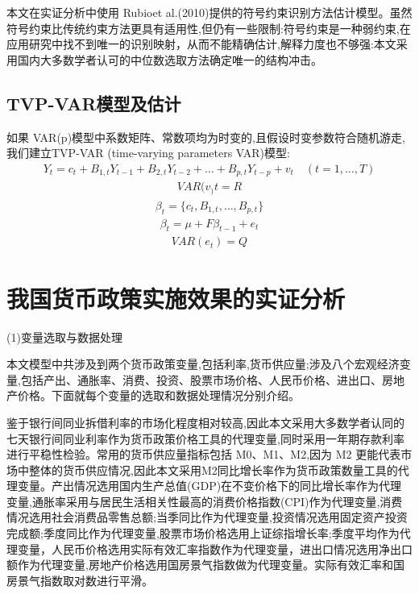 \documentclass{ijclclp}
\begin{document}
本文在实证分析中使用 Rubioet al.(2010)提供的符号约束识别方法估计模型。虽然符号约束比传统约束方法更具有适用性,但仍有一些限制:符号约束是一种弱约束,在应用研究中找不到唯一的识别映射，从而不能精确估计,解释力度也不够强:本文采用国内大多数学者认可的中位数选取方法确定唯一的结构冲击。

\subsection{TVP-VAR模型及估计}
如果 VAR(p)模型中系数矩阵、常数项均为时变的,且假设时变参数符合随机游走,我们建立TVP-VAR (time-varying parameters VAR)模型:
\begin{equation}
\begin{aligned}
Y_t = c_t + B_{1,t}Y_{t-1} + B_{2,t}Y_{t-2} + \dots + B_{p,t}Y_{t-p} + v_t \quad(t=1,\dots ,T)
\end{aligned}
\tag{9}
\end{equation}
\begin{equation}
\begin{aligned}
VAR(v_)t=R
\end{aligned}
\tag{10}
\end{equation}
\begin{equation}
\begin{aligned}
\beta_t=\{c_t,B_{1,t},\dots ,B_{p,t}\}
\end{aligned}
\tag{11}
\end{equation}
\begin{equation}
\begin{aligned}
\beta_t=\mu+F\beta_{t-1}+e_t
\end{aligned}
\tag{12}
\end{equation}
\begin{equation}
\begin{aligned}
VAR(e_t)=Q
\end{aligned}
\tag{12}
\end{equation}

\section{我国货币政策实施效果的实证分析}
(1)变量选取与数据处理

本文模型中共涉及到两个货币政策变量,包括利率,货币供应量;涉及八个宏观经济变量,包括产出、通胀率、消费、投资、股票市场价格、人民币价格、进出口、房地产价格。下面就每个变量的选取和数据处理情况分别介绍。

鉴于银行间同业拆借利率的市场化程度相对较高,因此本文采用大多数学者认同的七天银行间同业利率作为货币政策价格工具的代理变量,同时采用一年期存款利率进行平稳性检验。常用的货币供应量指标包括 M0、M1、M2,因为 M2 更能代表市场中整体的货币供应情况,因此本文采用M2同比增长率作为货币政策数量工具的代理变量。产出情况选用国内生产总值(GDP)在不变价格下的同比增长率作为代理变量,通胀率采用与居民生活相关性最高的消费价格指数(CPI)作为代理变量,消费情况选用社会消费品零售总额;当季同比作为代理变量,投资情况选用固定资产投资完成额;季度同比作为代理变量,股票市场价格选用上证综指增长率;季度平均作为代理变量，人民币价格选用实际有效汇率指数作为代理变量，进出口情况选用净出口额作为代理变量,房地产价格选用国房景气指数做为代理变量。实际有效汇率和国房景气指数取对数进行平滑。
\end{document}
